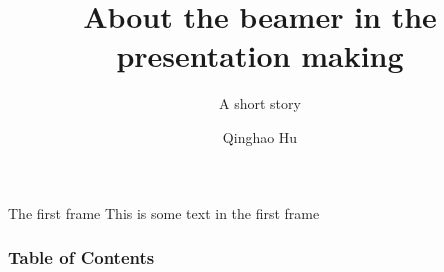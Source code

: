 \documentclass[11pt]{beamer}
\title[about the practice]
{About the beamer in the presentation making}
\subtitle{A short story}
\author{Qinghao Hu}
\begin{document}
\frame{\titlepage}

\begin{frame}{The first frame}
  This is some text in the first frame
\end{frame}

\begin{frame}
  \frametitle{Table of Contents}
  \tableofcontents
\end{frame}
\end{document}
